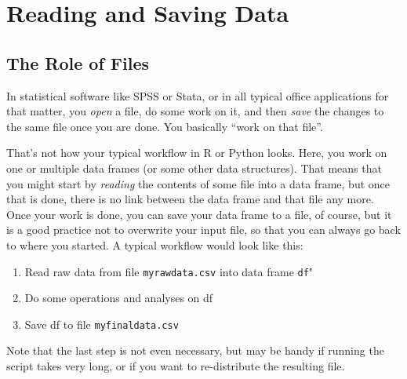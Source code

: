 



\section{Reading and Saving Data}
\label{sec:reading}

\subsection{The Role of Files}

In statistical software like SPSS or Stata, or in all typical office applications for that matter, you \emph{open} a file, do some work on it, and then \emph{save} the changes to the same file once you are done. You basically ``work on that file''.

That's not how your typical workflow in R or Python looks. Here, you work on one or multiple data frames (or some other data structures). That means that you might start by \emph{reading} the contents of some file into a data frame, but once that is done, there is no link between the data frame and that file any more. Once your work is done, you can save your data frame to a file, of course, but it is a good practice not to overwrite your input file, so that you can always go back to where you started. A typical workflow would  look like this:
\begin{enumerate}
\item Read raw data from file \texttt{\small{myrawdata.csv}} into data frame \texttt{\small{df}}"
\item Do some operations and analyses on df
\item Save df to file \texttt{\small{myfinaldata.csv}}
\end{enumerate}
Note that the last step is not even necessary, but may be handy if running the script takes very long, or if you want to re-distribute the resulting file.

